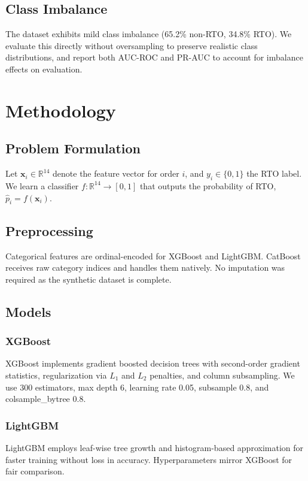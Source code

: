 \documentclass[conference]{IEEEtran}
\begin{document}
\subsection{Class Imbalance}

The dataset exhibits mild class imbalance (65.2\% non-RTO, 34.8\% RTO). We evaluate this directly without oversampling to preserve realistic class distributions, and report both AUC-ROC and PR-AUC to account for imbalance effects on evaluation.

\section{Methodology}
\label{sec:methods}

\subsection{Problem Formulation}

Let $\mathbf{x}_i \in \mathbb{R}^{14}$ denote the feature vector for order $i$, and $y_i \in \{0, 1\}$ the RTO label. We learn a classifier $f: \mathbb{R}^{14} \rightarrow [0, 1]$ that outputs the probability of RTO, $\hat{p}_i = f(\mathbf{x}_i)$.

\subsection{Preprocessing}

Categorical features are ordinal-encoded for XGBoost and LightGBM. CatBoost receives raw category indices and handles them natively. No imputation was required as the synthetic dataset is complete.

\subsection{Models}

\subsubsection{XGBoost}
XGBoost \cite{chen2016} implements gradient boosted decision trees with second-order gradient statistics, regularization via $L_1$ and $L_2$ penalties, and column subsampling. We use 300 estimators, max depth 6, learning rate 0.05, subsample 0.8, and colsample\_bytree 0.8.

\subsubsection{LightGBM}
LightGBM \cite{ke2017} employs leaf-wise tree growth and histogram-based approximation for faster training without loss in accuracy. Hyperparameters mirror XGBoost for fair comparison.
\end{document}
